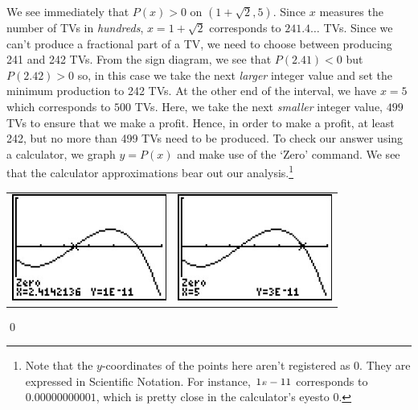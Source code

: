 \begin{ex}
We see immediately that $P(x)>0$ on $(1+\sqrt{2},5)$.  Since $x$ measures the number of TVs in \textit{hundreds}, $x = 1 + \sqrt{2}$ corresponds to $241.4\ldots$ TVs.  Since we can't produce a fractional part of a TV, we need to choose between producing 241 and 242 TVs.  From the sign diagram, we see that $P(2.41) < 0$ but $P(2.42)>0$ so, in this case we take the next \textit{larger} integer value and set the minimum production to 242 TVs.  At the other end of the interval, we have $x=5$ which corresponds to $500$ TVs.  Here, we take the next \textit{smaller} integer value, $499$ TVs to ensure that we make a profit.  Hence, in order to make a profit, at least 242, but no more than 499 TVs need to be produced.  To check our answer using a calculator, we graph $y=P(x)$ and make use of the `Zero' command. We see that the calculator approximations bear out our analysis.\footnote{Note that the $y$-coordinates of the points here aren't registered as $0$.  They are expressed in Scientific Notation.  For instance, $1 \mbox{\tiny $E$} -11$ corresponds to $0.00000000001$, which is pretty close in the calculator's eyes\footnotemark to $0$.}   

\begin{center}

\begin{tabular}{cc}

\includegraphics[width=2in]{./PolynomialsGraphics/LCDIneqZero1.jpg} \hspace{0.75in} & \includegraphics[width=2in]{./PolynomialsGraphics/LCDIneqZero2.jpg}

\end{tabular}

\end{center}   \qed

\end{ex}

